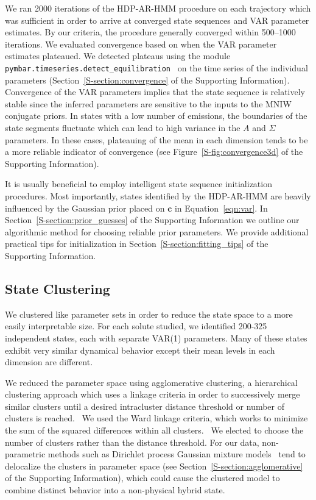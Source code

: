 \documentclass[journal=jpcbfk,manuscript=article]{achemso}
\begin{document}
  We ran 2000 iterations of the HDP-AR-HMM procedure on each trajectory which
  was sufficient in order to arrive at converged state sequences and VAR parameter
  estimates. By our criteria, the procedure generally converged within 500--1000 iterations. We 
  evaluated convergence based on when the VAR parameter estimates plateaued. 
  We detected plateaus using the module \texttt{pymbar.timeseries.detect\_equilibration}~\cite{chodera_simple_2016} 
  on the time series of the individual parameters (Section~\ref{S-section:convergence}
  of the Supporting Information). Convergence of the VAR parameters implies that
  the state sequence is relatively stable since the inferred parameters are 
  sensitive to the inputs to the MNIW conjugate priors. In states with a low number
  of emissions, the boundaries of the state segments fluctuate which can lead to high
  variance in the $A$ and $\Sigma$ parameters. In these cases, plateauing of the mean in each dimension 
  tends to be a more reliable indicator of convergence (see 
  Figure~\ref{S-fig:convergence3d} of the Supporting Information).
  
  It is usually beneficial to employ intelligent state sequence initialization procedures. 
  Most importantly, states identified by the HDP-AR-HMM are heavily influenced by the 
  Gaussian prior placed on $\mathbf{c}$ in Equation~\ref{eqn:var}. In 
  Section~\ref{S-section:prior_guesses} of the Supporting Information we outline our 
  algorithmic method for choosing reliable prior parameters. We provide additional 
  practical tips for initialization in Section~\ref{S-section:fitting_tips}
  of the Supporting Information.
  
  \subsection{State Clustering}\label{method:clustering}  

  We clustered like parameter sets in order to reduce the state space to
  a more easily interpretable size. For each solute studied, we identified 200-325
  independent states, each with separate VAR(1) parameters. Many of these states
  exhibit very similar dynamical behavior except their mean levels in each dimension
  are different.
  
  We reduced the parameter space using agglomerative clustering, a hierarchical
  clustering approach which uses a linkage criteria in order to successively merge
  similar clusters until a desired intracluster distance threshold or number of
  clusters is reached.~\cite{pedregosa_scikit-learn_2011} We used the Ward linkage 
  criteria, which works to minimize the sum of the squared differences within all
  clusters.~\cite{ward_hierarchical_1963} We elected to choose the number of clusters
  rather than the distance threshold. For our data, non-parametric methods such as 
  Dirichlet process Gaussian mixture models~\cite{pedregosa_scikit-learn_2011,gelman_bayesian_2013}
  tend to delocalize the clusters in parameter space (see Section~\ref{S-section:agglomerative}
  of the Supporting Information), which could cause the clustered model to combine 
  distinct behavior into a non-physical hybrid state.
\end{document}
